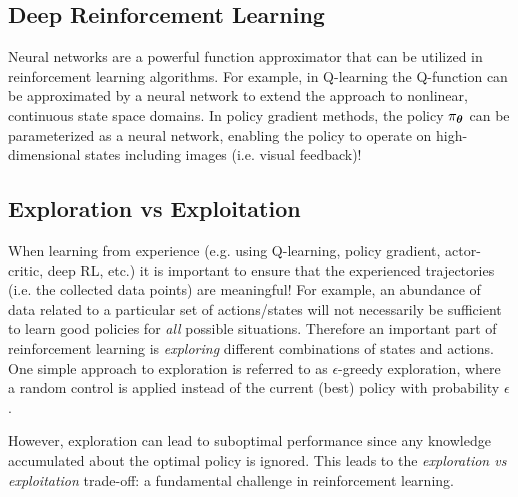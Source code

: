 \subsection{Deep Reinforcement Learning}
Neural networks are a powerful function approximator that can be utilized in reinforcement learning algorithms. For example, in Q-learning the Q-function can be approximated by a neural network to extend the approach to nonlinear, continuous state space domains. In policy gradient methods, the policy $\pi_{\bm{\theta}}$ can be parameterized as a neural network, enabling the policy to operate on high-dimensional states including images (i.e. visual feedback)!

\subsection{Exploration vs Exploitation}
When learning from experience (e.g. using Q-learning, policy gradient, actor-critic, deep RL, etc.) it is important to ensure that the experienced trajectories (i.e. the collected data points) are meaningful! For example, an abundance of data related to a particular set of actions/states will not necessarily be sufficient to learn good policies for \textit{all} possible situations. Therefore an important part of reinforcement learning is \textit{exploring} different combinations of states and actions. One simple approach to exploration is referred to as $\epsilon$-greedy exploration, where a random control is applied instead of the current (best) policy with probability $\epsilon$. 

However, exploration can lead to suboptimal performance since any knowledge accumulated about the optimal policy is ignored. This leads to the \textit{exploration vs exploitation} trade-off: a fundamental challenge in reinforcement learning.